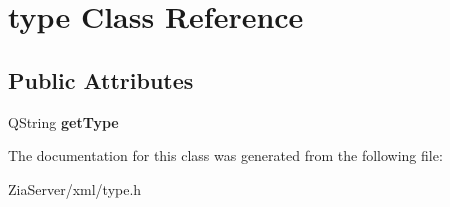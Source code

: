 \hypertarget{classtype}{
\section{type Class Reference}
\label{classtype}
}
\subsection*{Public Attributes}
\begin{DoxyCompactItemize}
\item 
\hypertarget{classtype_aca5a30fa5039605d18bded05c1db81c3}{
QString {\bfseries getType}}
\label{classtype_aca5a30fa5039605d18bded05c1db81c3}

\end{DoxyCompactItemize}


The documentation for this class was generated from the following file:\begin{DoxyCompactItemize}
\item 
ZiaServer/xml/type.h\end{DoxyCompactItemize}
